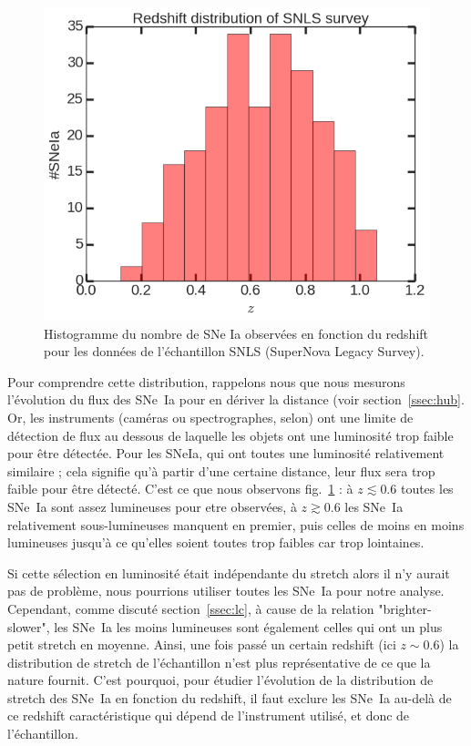\documentclass[a4paper, 12pt, svgnames]{article}
\begin{document}
\begin{figure}[htbp!]
    \centering
    \includegraphics[width=.5\linewidth]{Rapport_figures/redshift_miss.png}
    \captionsetup{justification=centering}
    \caption{Histogramme du nombre de SNe Ia observées en fonction du redshift
    pour les données de l'échantillon SNLS (SuperNova Legacy Survey).}
    \label{fig:redshift_miss}
\end{figure}

Pour comprendre cette distribution, rappelons nous que nous mesurons l'évolution
du flux des SNe~Ia pour en dériver la distance (voir section~\ref{ssec:hub}. Or,
les instruments (caméras ou spectrographes, selon) ont une limite de détection
de flux au dessous de laquelle les objets ont une luminosité trop faible pour
être détectée. Pour les SNeIa, qui ont toutes une luminosité relativement
similaire ; cela signifie qu'à partir d'une certaine distance, leur flux sera
trop faible pour être détecté. C'est ce que nous observons
fig.~\ref{fig:redshift_miss} : à $z\lesssim0.6$ toutes les SNe~Ia sont assez
lumineuses pour etre observées, à $z\gtrsim 0.6$ les SNe~Ia relativement
sous-lumineuses manquent en premier, puis celles de moins en moins lumineuses
jusqu'à ce qu'elles soient toutes trop faibles car trop lointaines. \bigbreak

Si cette sélection en luminosité était indépendante du stretch alors il n'y
aurait pas de problème, nous pourrions utiliser toutes les SNe~Ia pour notre
analyse. Cependant, comme discuté section~\ref{ssec:lc}, à cause de la relation
"brighter-slower", les SNe~Ia les moins lumineuses sont également celles qui ont
un plus petit stretch en moyenne. Ainsi, une fois passé un certain redshift (ici
$z\sim0.6$) la distribution de stretch de l'échantillon n'est plus
représentative de ce que la nature fournit. C'est pourquoi, pour étudier
l'évolution de la distribution de stretch des SNe~Ia en fonction du redshift, il
faut exclure les SNe~Ia au-delà de ce redshift caractéristique qui dépend de
l'instrument utilisé, et donc de l'échantillon. \bigbreak
\end{document}
